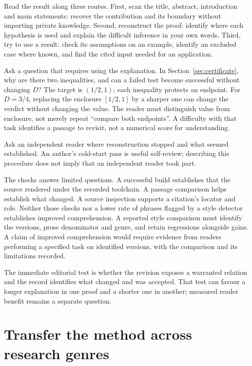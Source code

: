 Read the result along three routes. First, scan the title, abstract,
introduction and main statements: recover the contribution and its boundary
without importing private knowledge. Second, reconstruct the proof: identify
where each hypothesis is used and explain the difficult inference in your own
words. Third, try to use a result: check its assumptions on an example, identify
an excluded case where known, and find the cited input needed for an application.

Ask a question that requires using the explanation. In
Section~\ref{sec:certificate}, why are there two inequalities, and can a failed
test become successful without changing $D$? The target is $(1/2,1)$; each
inequality protects an endpoint. For $D=3/4$, replacing the enclosure $[1/2,1]$
by a sharper one can change the verdict without changing the value. The reader
must distinguish value from enclosure, not merely repeat ``compare both endpoints''.
A difficulty with that task identifies a passage to revisit, not a numerical
score for understanding.

Ask an independent reader where reconstruction stopped and what seemed
established. An author's cold-start pass is useful self-review; describing
this procedure does not imply that an independent reader took part.

The checks answer limited questions. A successful build establishes that the
source rendered under the recorded toolchain. A passage comparison helps
establish what changed. A source inspection supports a citation's locator
and role. Neither those checks nor a lower rate of phrases flagged by a style
detector establishes improved comprehension. A reported style comparison must
identify the versions, prose denominator and genre, and retain regressions
alongside gains. A claim of improved comprehension would require evidence
from readers performing a specified task on identified versions, with the
comparison and its limitations recorded.

The immediate editorial test is whether the revision exposes a warranted
relation and the record identifies what changed and was accepted. That test
can favour a longer explanation in one proof and a shorter one in another;
measured reader benefit remains a separate question.


\section{Transfer the method across research genres}\label{sec:genre-transfer}

